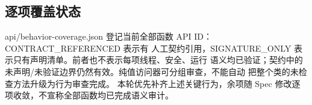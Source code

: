 \subsection{逐项覆盖状态}
api/behavior-coverage.json 登记当前全部函数 API ID：CONTRACT\_REFERENCED 表示有
人工契约引用，SIGNATURE\_ONLY 表示只有声明清单。前者也不表示每项线程、安全、运行
语义均已验证；契约中的未声明/未验证边界仍然有效。纯值访问器可分组审查，不能自动
把整个类的未检查方法升级为行为审查完成。
本轮优先补齐上述关键行为，余项随 Spec 修改逐项收敛，不宣称全部函数均已完成语义审计。
